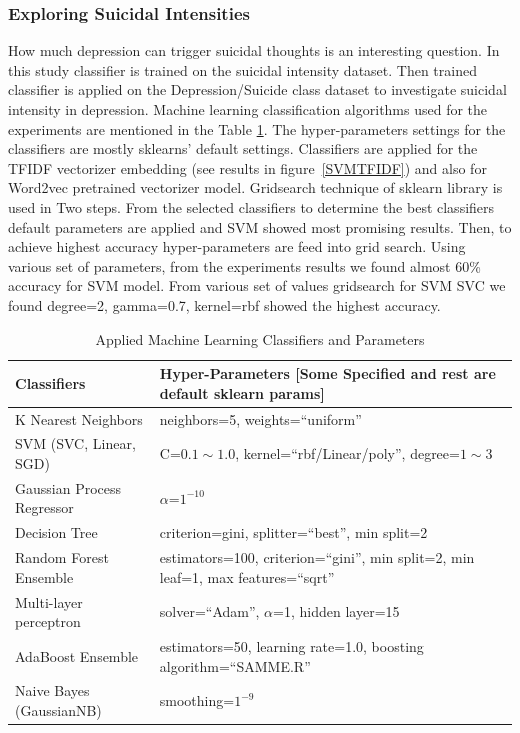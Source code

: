 \documentclass[sn-mathphys,Numbered]{sn-jnl}%
\theoremstyle{thmstyleone}%
\theoremstyle{thmstyletwo}%
\theoremstyle{thmstylethree}%
\begin{document}
\subsubsection{Exploring Suicidal Intensities}
\label{classification_res}
How much depression can trigger suicidal thoughts is an interesting question. In this study classifier is trained on the suicidal intensity dataset. Then trained classifier is applied on the Depression/Suicide class dataset to investigate suicidal intensity in depression. Machine learning classification algorithms used for the experiments are mentioned in the Table \ref{Table_classification_alg}. The hyper-parameters settings for the classifiers are mostly sklearns' default settings. Classifiers are applied for the TFIDF vectorizer embedding (see results in figure~\ref{SVMTFIDF}) and also for Word2vec pretrained vectorizer model. Gridsearch technique of sklearn library is used in Two steps. From the selected classifiers to determine the best classifiers default parameters are applied and SVM showed most promising results. Then, to achieve highest accuracy hyper-parameters are feed into grid search. Using various set of parameters, from the experiments results we found almost 60\% accuracy for SVM model. From various set of values gridsearch for SVM SVC we found degree=2, gamma=0.7, kernel=rbf showed the highest accuracy. 
%
\begin{table}[h]
\begin{center}
\begin{flushleft}
\caption{Applied Machine Learning Classifiers and Parameters}\label{Table_classification_alg}%
\begin{tabular}{|l|p{8cm}|}
\toprule
\textbf{Classifiers} & \textbf{Hyper-Parameters [Some Specified and rest are default sklearn params]} \\
\midrule
K Nearest Neighbors & neighbors=5,  weights=\enquote{uniform} \\
SVM (SVC, Linear, SGD)& C=$0.1\sim 1.0$, kernel=\enquote{rbf/Linear/poly}, degree=$1\sim 3$\\
Gaussian Process Regressor & $\alpha$=$1^{-10}$ \\
Decision Tree & criterion=gini, splitter=\enquote{best}, min split=2  \\
Random Forest Ensemble & estimators=100, criterion=\enquote{gini}, min split=2, min leaf=1, max features=\enquote{sqrt}\\
Multi-layer perceptron & solver=\enquote{Adam}, $\alpha$=1, hidden layer=15 \\
AdaBoost Ensemble & estimators=50, learning rate=1.0, boosting algorithm=\enquote{SAMME.R}\\
Naive Bayes (GaussianNB) & smoothing=$1^{-9}$\\
\bottomrule
\end{tabular}
\end{flushleft}
\end{center}
\end{table}
\end{document}
